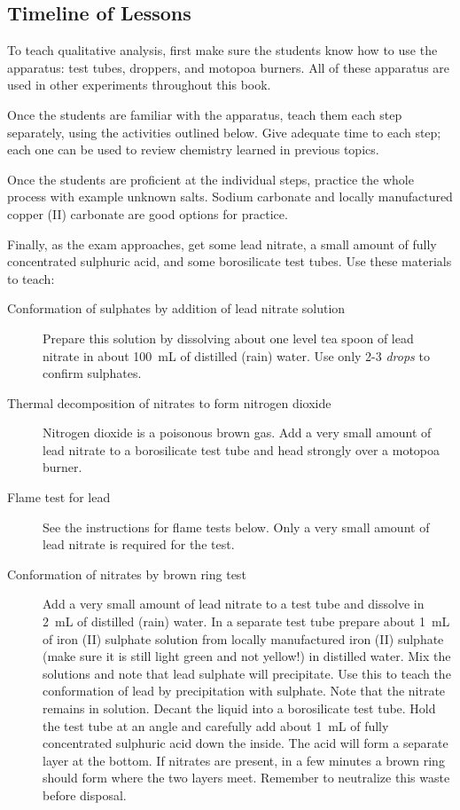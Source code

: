 \subsection{Timeline of Lessons}

To teach qualitative analysis, first make sure the students know how to use the apparatus: test tubes, droppers, and motopoa burners. All of these apparatus are used in other experiments throughout this book.

Once the students are familiar with the apparatus, teach them each step separately, using the activities outlined below. Give adequate time to each step; each one can be used to review chemistry learned in previous topics.

Once the students are proficient at the individual steps, practice the whole process with example unknown salts. Sodium carbonate and locally manufactured copper (II) carbonate are good options for practice.

Finally, as the exam approaches, get some lead nitrate, a small amount of fully concentrated sulphuric acid, and some borosilicate test tubes. Use these materials to teach:
\begin{description}
\item[Conformation of sulphates by addition of lead nitrate solution]{Prepare this solution by dissolving about one level tea spoon of lead nitrate in about 100~mL of distilled (rain) water. Use only 2-3 \textit{drops} to confirm sulphates.}
\item[Thermal decomposition of nitrates to form nitrogen dioxide]{Nitrogen dioxide is a poisonous brown gas. Add a very small amount of lead nitrate to a borosilicate test tube and head strongly over a motopoa burner.}
\item[Flame test for lead]{See the instructions for flame tests below. Only a very small amount of lead nitrate is required for the test.}
\item[Conformation of nitrates by brown ring test]{Add a very small amount of lead nitrate to a test tube and dissolve in 2~mL of distilled (rain) water. In a separate test tube prepare about 1~mL of iron (II) sulphate solution from locally manufactured iron (II) sulphate (make sure it is still light green and not yellow!) in distilled water. Mix the solutions and note that lead sulphate will precipitate. Use this to teach the conformation of lead by precipitation with sulphate. Note that the nitrate remains in solution. Decant the liquid into a borosilicate test tube. Hold the test tube at an angle and carefully add about 1~mL of fully concentrated sulphuric acid down the inside. The acid will form a separate layer at the bottom. If nitrates are present, in a few minutes a brown ring should form where the two layers meet. Remember to neutralize this waste before disposal.}
\end{description}

